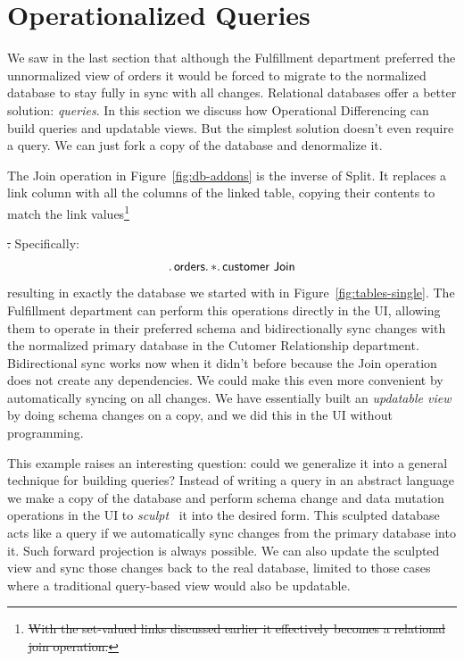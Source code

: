 \documentclass[english,submission]{programming}
\theoremstyle{definition}
\providecommand{\DIFadd}[1]{{\protect\color{blue}\uwave{#1}}} %
\providecommand{\DIFdel}[1]{{\protect\color{red}\sout{#1}}} %
\providecommand{\DIFaddbegin}{} %
\providecommand{\DIFaddend}{} %
\providecommand{\DIFdelbegin}{} %
\providecommand{\DIFdelend}{} %
\begin{document}
\DIFaddend \section{Operationalized Queries}

We saw in the last section that although the Fulfillment department preferred the unnormalized view of orders it would be forced to migrate to the normalized database to stay fully in sync with all changes. Relational databases offer a better solution: \textit{queries}. In this section we discuss how Operational Differencing can build queries and updatable views. But the simplest solution doesn't even require a query. We can just fork a copy of the database and denormalize it.

The \textsf{Join} operation in Figure~\ref{fig:db-addons}
is the inverse of \textsf{Split}. It replaces a link column with all the columns of the linked table, copying their contents to match the link values\DIFdelbegin \footnote{\DIFdel{With the set-valued links discussed earlier it effectively becomes a relational join operation.}}%
\addtocounter{footnote}{-1}%
\DIFdel{.
}\DIFdelend \DIFaddbegin \DIFadd{.
}\DIFaddend Specifically:
\[
\ldotp \textsf{orders}\ldotp * \ldotp \textsf{customer Join} \\
\]
resulting in exactly the database we started with in Figure~\ref{fig:tables-single}.
The Fulfillment department can perform this operations directly in the UI, allowing them
to operate in their preferred schema and bidirectionally sync changes with the normalized primary database in the Cutomer Relationship department. Bidirectional sync works now when it didn't before because the \textsf{Join} operation does not create any dependencies. We could make this even more convenient by automatically syncing on all changes. We have essentially built an \textit{updatable view} by doing schema changes on a copy, and we did this in the UI without programming.

This example raises an interesting question: could we generalize it into a general technique for building queries? Instead of writing a query in an abstract language we make a copy of the database and perform schema change and data mutation operations in the UI to \textit{sculpt}~\cite{sculpin} it into the desired form. This sculpted database acts like a query if we automatically sync changes from the primary database into it. Such forward projection is always possible. We can also update the sculpted view and sync those changes back to the real database, limited to those cases where a traditional query-based view would also be updatable.
\end{document}
